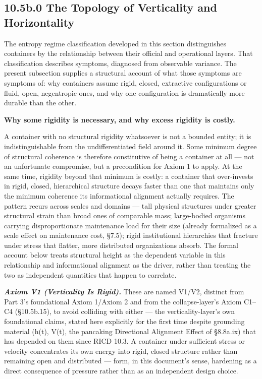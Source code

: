 \documentclass[
]{article}
\begin{document}
\hypertarget{b.0-the-topology-of-verticality-and-horizontality}{%
\subsection{10.5b.0 The Topology of Verticality and
Horizontality}\label{b.0-the-topology-of-verticality-and-horizontality}}

The entropy regime classification developed in this section
distinguishes containers by the relationship between their official and
operational layers. That classification describes symptoms, diagnosed
from observable variance. The present subsection supplies a structural
account of what those symptoms are symptoms of: why containers assume
rigid, closed, extractive configurations or fluid, open, negentropic
ones, and why one configuration is dramatically more durable than the
other.

\textbf{Why some rigidity is necessary, and why excess rigidity is
costly.}

A container with no structural rigidity whatsoever is not a bounded
entity; it is indistinguishable from the undifferentiated field around
it. Some minimum degree of structural coherence is therefore
constitutive of being a container at all --- not an unfortunate
compromise, but a precondition for Axiom 1 to apply. At the same time,
rigidity beyond that minimum is costly: a container that over-invests in
rigid, closed, hierarchical structure decays faster than one that
maintains only the minimum coherence its informational alignment
actually requires. The pattern recurs across scales and domains --- tall
physical structures under greater structural strain than broad ones of
comparable mass; large-bodied organisms carrying disproportionate
maintenance load for their size (already formalized as a scale effect on
maintenance cost, §7.5); rigid institutional hierarchies that fracture
under stress that flatter, more distributed organizations absorb. The
formal account below treats structural height as the dependent variable
in this relationship and informational alignment as the driver, rather
than treating the two as independent quantities that happen to
correlate.

\emph{\textbf{Axiom V1 (Verticality Is Rigid).}} These are named V1/V2,
distinct from Part 3's foundational Axiom 1/Axiom 2 and from the
collapse-layer's Axiom C1--C4 (§10.5b.15), to avoid colliding with
either --- the verticality-layer's own foundational claims, stated here
explicitly for the first time despite grounding material (h(t), V(t),
the pancaking Directional Alignment Effect of §8.8a.ix) that has
depended on them since RICD 10.3. A container under sufficient stress or
velocity concentrates its own energy into rigid, closed structure rather
than remaining open and distributed --- form, in this document's sense,
hardening as a direct consequence of pressure rather than as an
independent design choice.
\end{document}

